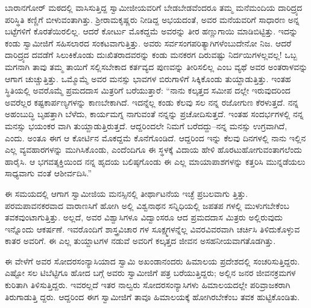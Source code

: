 ಬಾರಾನಗೋರ್ ಮಠದಲ್ಲಿ ವಾಸಿಸುತ್ತಿದ್ದ ಸ್ವಾಮೀಜೀಯವರಿಗೆ ಬೇಡಬೇಡವೆಂದರೂ ತಮ್ಮ ಮನೆಮಂದಿಯ ದಾರಿದ್ರ್ಯದ ಪರಿಸ್ಥಿತಿ ಕಣ್ಣಿಗೆ ಬೀಳುವಂತಾಗಿತ್ತು. ಶ್ರೀರಾಮಕೃಷ್ಣರು ನೀಡಿದ್ದ ಅಭಯದಂತೆ, ಅವರ ಮನೆಯವರಿಗೆ ಸಾಧಾರಣ ಅನ್ನ ಬಟ್ಟೆಗಳಿಗೆ ಕೊರತೆಯಿರಲಿಲ್ಲ. ಆದರೆ ಕೋರ್ಟು ಮೊಕದ್ದಮೆ ಅವರನ್ನು ತೀರ ಹಣ್ಣುಗಾಯಿ ಮಾಡಿಬಿಟ್ಟಿತ್ತು. ಇದನ್ನು ಕಂಡು ಸ್ವಾಮೀಜಿಗೆ ಸಹಿಸಲಾರದ ಸಂಕಟವಾಗುತ್ತಿತ್ತು. ಅವರು ಸರ್ವಸಂಗಪರಿತ್ಯಾಗಿಗಳೆಂಬುದೇನೋ ನಿಜ. ಆದರೆ ದಾರಿದ್ರ್ಯದ ದವಡೆಗೆ ಸಿಲುಕಿಕೊಂಡು ದುಃಖಿತರಾದವರನ್ನು ಕಂಡು ಮನಕರಗ ದಿರುವಷ್ಟು ನಿರ್ದಯಿಗಳಲ್ಲವಲ್ಲ! ಒಬ್ಬ ಮಗನಾಗಿ ತಾವು ತಮ್ಮ ತಾಯಿಗೆ ಸಲ್ಲಿಸಬೇಕಾದ ಕರ್ತವ್ಯದ ಪುಣವನ್ನು ತೀರಿಸಲಿಲ್ಲ ಎಂಬ ವ್ಯಥೆ ಅವರ ಅಂತರಾಳವನ್ನು ಆಗಾಗ ಚುಚ್ಚುತ್ತಿತ್ತು. ಒಮ್ಮೊಮ್ಮೆ ಅವರ ಮನಸ್ಸು ಭಾವಗಳ ಬಿರುಗಾಳಿಗೆ ಸಿಕ್ಕಿಕೊಂಡು ತುಯ್ದಾಡುತ್ತಿತ್ತು. ಇಂತಹ ಸ್ಥಿತಿಯಲ್ಲಿ ಅವರೊಮ್ಮೆ ಪ್ರಮದದಾಸ ಮಿತ್ರರಿಗೆ ಬರೆಯುತ್ತಾರೆ: “ನಾನು ಕಲ್ಕತ್ತದ ಸಮೀಪ ದಲ್ಲೇ ಇರುವುದರಿಂದ ಅವರೆಲ್ಲರ ಕಷ್ಟಕಾರ್ಪಣ್ಯಗಳನ್ನು ಕಾಣಬೇಕಾಗಿದೆ. ಇದನ್ನೆಲ್ಲ ಕಂಡು ಕೆಲವು ಸಲ ನನ್ನ ರಜೋಗುಣ ಕೆರಳುತ್ತದೆ. ನನ್ನ ಅಹಂಬುದ್ಧಿ ಬೃಹತ್ತಾಗಿ ಬೆಳೆದು, ಕಾರ್ಯಮಗ್ನ ನಾಗುವಂತೆ ನನ್ನನ್ನು ಪ್ರಚೋದಿಸುತ್ತದೆ. ಇಂತಹ ಸಂದರ್ಭಗಳಲ್ಲಿ ನನ್ನ ಮನಸ್ಸು ಭಯಂಕರ ವಾಗಿ ತುಯ್ದಾಡುತ್ತಿರುತ್ತದೆ. ಆದ್ದರಿಂದಲೇ ನಿಮಗೆ ಬರೆದದ್ದು–ನನ್ನ ಮನಸ್ಸು ಉಗ್ರವಾಗಿದೆ, ಎಂದು. ಅಂತೂ ಈಗ ಆ ಕೋರ್ಟಿನ ಮೊಕದ್ದಮೆ ಕೊನೆಗೊಂಡಿದೆ. ಆದ್ದರಿಂದ ಇನ್ನು ಕೆಲವು ದಿನಗಳಲ್ಲಿ ನಾನು ಇಲ್ಲಿನ ಎಲ್ಲ ವ್ಯವಹಾರಗಳನ್ನು ಮುಗಿಸಿಕೊಂಡು, ಎಂದೆಂದಿಗೂ ಈ ಸ್ಥಳಕ್ಕೆ ವಿದಾಯ ಹೇಳಿ ಹೊರಟುಹೋಗುವಂತಾಗಲೆಂದು ಹಾರೈಸಿ. ಆ ಭಗವತ್ಶಕ್ತಿಯಿಂದ ನನ್ನ ಹೃದಯ ಬಲಿಷ್ಠಗೊಂಡು ಈ ಎಲ್ಲ ಮಾಯಾಪಾಶಗಳನ್ನು ಕತ್ತರಿಸಿ ಮುನ್ನಡೆಯಲು ಸಾಧ್ಯವಾಗು ವಂತೆ ಆಶೀರ್ವದಿಸಿ.”

ಈ ಸಮಯದಲ್ಲಿ ಆಗಾಗ ಸ್ವಾಮೀಜಿಯ ಮನಸ್ಸಿನಲ್ಲಿ ತೀರ್ಥಾಟನೆಯ ಇಚ್ಛೆ ಪ್ರಬಲವಾಗು ತ್ತಿತ್ತು. ಪರಮಪಾವನಕರವಾದ ವಾರಾಣಸಿಗೆ ಹೋಗಿ ಅಲ್ಲಿ ವಿಶ್ವನಾಥನ ಸನ್ನಿಧಿಯಲ್ಲಿ ಜಪತಪ ಗಳಲ್ಲಿ ಮುಳುಗಬೇಕೆಂಬ ತವಕವುಂಟಾಗುತ್ತಿತ್ತು. ಅಲ್ಲದೆ, ಅವರ ವಿಶ್ವಾಸಿಗಳೂ ವಿದ್ವಾಂಸರೂ ಆದ ಪ್ರಮದದಾಸ ಮಿತ್ರರು ಅಲ್ಲಿರುವುದು ಇನ್ನೊಂದು ಆಕರ್ಷಣೆ. ಇವರೊಂದಿಗೆ ಶಾಸ್ತ್ರವಿಚಾರ ಗಳ ಸೂಕ್ಷ್ಮಗಳನ್ನೆಲ್ಲ ವಿವರವಿವರವಾಗಿ ಚರ್ಚಿಸಿ ತಿಳಿದುಕೊಳ್ಳುವ ಕಾತರ ಅವರಿಗೆ. ಈ ಎಲ್ಲ ತುಯ್ದಾಟಗಳ ನಡುವೆ ಅವರಿಗೆ ಕಲ್ಕತ್ತದ ಜೀವನ ಅಸಹನೀಯವಾಗತೊಡಗಿತ್ತು.

ಈ ವೇಳೆಗೆ ಅವರ ಸೋದರಸಂನ್ಯಾಸಿಯಾದ ಸ್ವಾಮಿ ಅಖಂಡಾನಂದರು ಹಿಮಾಲಯ ಪ್ರದೇಶದಲ್ಲಿ ಸಂಚರಿಸುತ್ತಿದ್ದರು. ಎಷ್ಟೋ ಸಲ ಟಿಬೆಟ್ಟಿಗೂ ಹೋದ ಬಗ್ಗೆ ಅವರು ಸ್ವಾಮೀಜಿಗೆ ಪತ್ರ ಬರೆಯುತ್ತಿದ್ದರು; ಅಲ್ಲಿನ ಜನರ ಜೀವನಕ್ರಮಗಳ ಕುರಿತಾಗಿ ತಿಳಿಸುತ್ತಿದ್ದರು. ಇವರಲ್ಲದೆ ಇತರ ನಾಲ್ವರು ಸೋದರಸಂನ್ಯಾಸಿಗಳು ಹಿಮಾಲಯದಲ್ಲೇ ಪರಿವ್ರಾಜಕರಾಗಿ ತಿರುಗಾಡುತ್ತಿ ದ್ದರು. ಆದ್ದರಿಂದ ಈಗ ಸ್ವಾಮೀಜಿಗೆ ತಾವೂ ಹಿಮಾಲಯಕ್ಕೆ ಹೋಗಿರಬೇಕೆಂಬ ತವಕ ಹುಟ್ಟಿಕೊಂಡಿತು.

